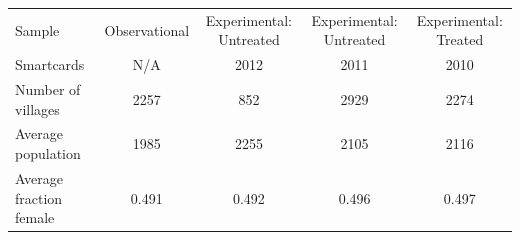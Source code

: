 
\begin{tabular}{l|cccc}
\toprule
Sample & Observational & Experimental: Untreated & Experimental: Untreated & Experimental: Treated\\
Smartcards & N/A & 2012 & 2011 & 2010\\
\midrule
Number of villages & 2257 & 852 & 2929 & 2274\\
Average population & 1985 & 2255 & 2105 & 2116\\
Average fraction female & 0.491 & 0.492 & 0.496 & 0.497\\
\bottomrule
\end{tabular}
